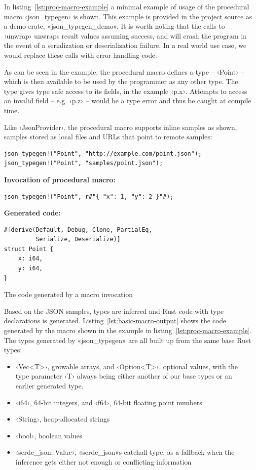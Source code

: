 In listing~\ref{lst:proc-macro-example} a minimal example of usage of the procedural macro ‹json_typegen› is shown. This example is provided in the project source as a demo crate, «json_typegen_demo». It is worth noting that the calls to ‹unwrap› unwraps result values assuming success, and will crash the program in the event of a serialization or deserialization failure. In a real world use case, we would replace these calls with error handling code.

As can be seen in the example, the procedural macro defines a type -- ‹Point› -- which is then available to be used by the programmer as any other type. The type gives type safe access to its fields, in the example ‹p.x›. Attempts to access an invalid field -- e.g. ‹p.z› -- would be a type error and thus be caught at compile time.

Like ‹JsonProvider›, the procedural macro supports inline samples as shown, samples stored as local files and URLs that point to remote samples:

\begin{verbatim}
json_typegen!("Point", "http://example.com/point.json");
json_typegen!("Point", "samples/point.json");
\end{verbatim}

\begin{listing}[ht!]
\textbf{Invocation of procedural macro:}
\begin{verbatim}
json_typegen!("Point", r#"{ "x": 1, "y": 2 }"#);
\end{verbatim}
\vspace{5mm}

\textbf{Generated code:}
\begin{verbatim}
#[derive(Default, Debug, Clone, PartialEq,
         Serialize, Deserialize)]
struct Point {
    x: i64,
    y: i64,
}
\end{verbatim}
\caption{The code generated by a macro invocation}
\label{lst:basic-macro-output}
\end{listing}

Based on the JSON samples, types are inferred and Rust code with type declarations is generated. Listing~\ref{lst:basic-macro-output} shows the code generated by the macro shown in the example in listing~\ref{lst:proc-macro-example}. The types generated by «json_typegen» are all built up from the same base Rust types:

\begin{itemize}
  \item ‹Vec<T>›, growable arrays, and ‹Option<T>›, optional values, with the type parameter ‹T› always being either another of our base types or an earlier generated type.
  \item ‹i64›, 64-bit integers, and ‹f64›, 64-bit floating point numbers
  \item ‹String›, heap-allocated strings
  \item ‹bool›, boolean values
  \item ‹serde_json::Value›, «serde_json»s catchall type, as a fallback when the inference gets either not enough or conflicting information
\end{itemize}

